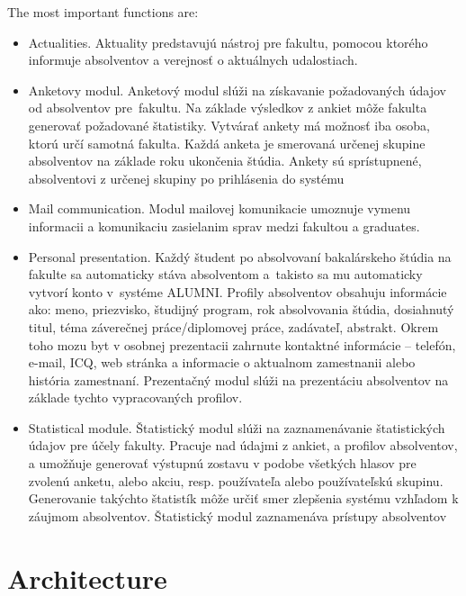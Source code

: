 \documentclass{iitsrc}[2006/14/02]
\begin{document}
The most important functions are:
\begin{itemize}

\item Actualities. Aktuality predstavujú nástroj pre fakultu, pomocou ktorého informuje absolventov a verejnosť o aktuálnych udalostiach.

\item Anketovy modul.
Anketový modul slúži na získavanie požadovaných údajov od absolventov pre fakultu. Na základe výsledkov z ankiet môže fakulta generovať požadované štatistiky. Vytvárať ankety má možnosť iba osoba, ktorú určí samotná fakulta. Každá anketa je smerovaná určenej skupine absolventov na základe roku ukončenia štúdia. Ankety sú sprístupnené, absolventovi z určenej skupiny  po prihlásenia do systému

\item Mail communication. 
Modul mailovej komunikacie umoznuje vymenu informacii a komunikaciu zasielanim sprav medzi fakultou a graduates. 

\item Personal presentation. 
Každý študent po absolvovaní bakalárskeho štúdia na fakulte sa automaticky stáva absolventom a takisto sa mu automaticky vytvorí konto v systéme ALUMNI. Profily absolventov obsahuju informácie ako: meno, priezvisko, študijný program, rok absolvovania štúdia, dosiahnutý titul, téma záverečnej práce/diplomovej práce, zadávateľ, abstrakt. Okrem toho mozu byt v osobnej prezentacii zahrnute 
kontaktné informácie – telefón, e-mail, ICQ,  web stránka a informacie o aktualnom zamestnanii alebo história zamestnaní. Prezentačný modul slúži na prezentáciu absolventov na základe tychto vypracovaných profilov. 

\item Statistical module. 
Štatistický modul slúži na zaznamenávanie štatistických údajov pre účely fakulty. Pracuje nad údajmi z ankiet, a profilov absolventov, a umožňuje generovať výstupnú zostavu v podobe všetkých hlasov pre zvolenú anketu, alebo akciu, resp. používateľa alebo používateľskú skupinu. Generovanie takýchto štatistík môže určiť smer zlepšenia systému vzhľadom k záujmom absolventov. Štatistický modul zaznamenáva prístupy absolventov

\end{itemize}

\section{Architecture}
\end{document}
